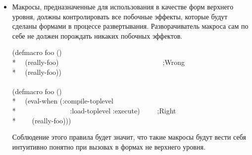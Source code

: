 \begin{newer}
\begin{defspec}
\begin{itemize}
   \item Макросы, предназначенные для использования в качестве форм верхнего
     уровня, должны контролировать все побочные эффекты, которые будут сделаны
     формами в процессе развертывания.
     Разворачиватель макроса сам по себе не должен порождать никаких побочных
     эффектов.
     
\begin{lisp}
(defmacro foo () \\*
~~(really-foo)~~~~~~~~~~~~~~~~~~~~~~~~~~~~~~;{\rm Wrong}\\*
~~{\Xbq}(really-foo)) \\
\\
(defmacro foo () \\*
~~{\Xbq}(eval-when (:compile-toplevel \\*
~~~~~~~~~~~~~~~:load-toplevel :execute)~~~~~;{\rm Right} \\*
~~~~(really-foo)))
\end{lisp}
     Соблюдение этого правила будет значит, что такие макросы будут вести себя
     интуитивно понятно при вызовах в формах не верхнего уровня.


\end{itemize}
\end{defspec}
\end{newer}
